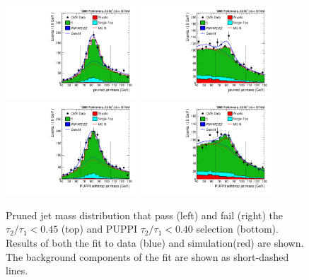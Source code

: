 \begin{figure}[htbp]
\centering
\includegraphics[width=0.44\textwidth]{figures/vtagging/AN-16-215/_HP0v45powheg_76X_em_pTbin_200_5000.pdf}
\includegraphics[width=0.44\textwidth]{figures/vtagging/AN-16-215/_HP0v45powheg_76X_em_fail_pTbin_200_5000.pdf} \\
\includegraphics[width=0.44\textwidth]{figures/vtagging/AN-16-215/_HP0v40powheg_76X_PuppiSD_em_pTbin_200_5000.pdf}
\includegraphics[width=0.44\textwidth]{figures/vtagging/AN-16-215/_HP0v40powheg_76X_PuppiSD_em_fail_pTbin_200_5000.pdf}\\
\caption{Pruned jet mass distribution that pass (left) and fail (right) the $\tau_2 / \tau_1 < 0.45$ (top) and PUPPI $\tau_2 / \tau_1 < 0.40$ selection (bottom). Results of both the fit to data (blue) and simulation(red) are shown. The background components of the fit are shown as short-dashed lines.}
\label{fig:ttbarControl_nocut}
\end{figure}


